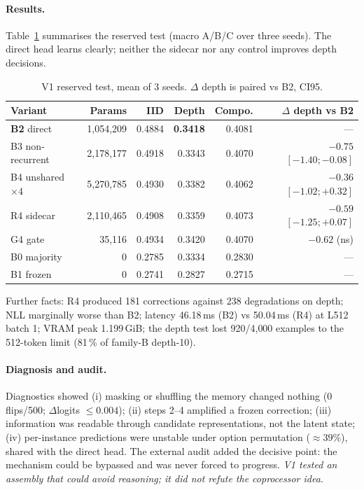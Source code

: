 \documentclass[11pt,a4paper]{article}
\newcommand{\dpt}{\ensuremath{\Delta}}
\begin{document}
\paragraph{Results.} Table~\ref{tab:v1} summarises the reserved test (macro A/B/C over three seeds). The direct head learns clearly; neither the sidecar nor any control improves depth decisions.

\begin{table}[t]
\centering
\caption{V1 reserved test, mean of 3 seeds. $\dpt$ depth is paired vs B2, CI95.}
\label{tab:v1}
\small
\begin{tabular}{lrrrrr}
\toprule
Variant & Params & IID & Depth & Compo. & $\dpt$ depth vs B2 \\
\midrule
\textbf{B2} direct & 1{,}054{,}209 & 0.4884 & \textbf{0.3418} & 0.4081 & --- \\
B3 non-recurrent & 2{,}178{,}177 & 0.4918 & 0.3343 & 0.4070 & $-0.75$ $[-1.40;-0.08]$ \\
B4 unshared $\times4$ & 5{,}270{,}785 & 0.4930 & 0.3382 & 0.4062 & $-0.36$ $[-1.02;+0.32]$ \\
R4 sidecar & 2{,}110{,}465 & 0.4908 & 0.3359 & 0.4073 & $-0.59$ $[-1.25;+0.07]$ \\
G4 gate & 35{,}116 & 0.4934 & 0.3420 & 0.4070 & $-0.62$ (ns) \\
B0 majority & 0 & 0.2785 & 0.3334 & 0.2830 & --- \\
B1 frozen & 0 & 0.2741 & 0.2827 & 0.2715 & --- \\
\bottomrule
\end{tabular}
\end{table}

Further facts: R4 produced 181 corrections against 238 degradations on depth; NLL marginally worse than B2; latency 46.18\,ms (B2) vs 50.04\,ms (R4) at L512 batch 1; VRAM peak 1.199\,GiB; the depth test lost 920/4{,}000 examples to the 512-token limit (81\,\% of family-B depth-10).

\paragraph{Diagnosis and audit.} Diagnostics showed (i) masking or shuffling the memory changed nothing (0 flips/500; $\dpt$logits $\le 0.004$); (ii) steps 2--4 amplified a frozen correction; (iii) information was readable through candidate representations, not the latent state; (iv) per-instance predictions were unstable under option permutation ($\approx 39\%$), shared with the direct head. The external audit added the decisive point: the mechanism could be bypassed and was never forced to progress. \emph{V1 tested an assembly that could avoid reasoning; it did not refute the coprocessor idea.}
\end{document}

